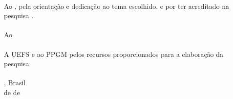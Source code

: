 
\begin{agradecimentos}

\ \\
Ao \theadvisor, pela orientação e dedicação ao tema escolhido, e por ter acreditado na pesquisa .\\
\\
Ao \thecoadvisor \\
\\
A UEFS e ao PPGM pelos recursos proporcionados para a elaboração da pesquisa\\
\\

\noindent
\ppgmcidade, Brasil \hfill \theauthor\\
\ppgmdia\space de \ppgmmes\space de \ppgmano
\end{agradecimentos}
